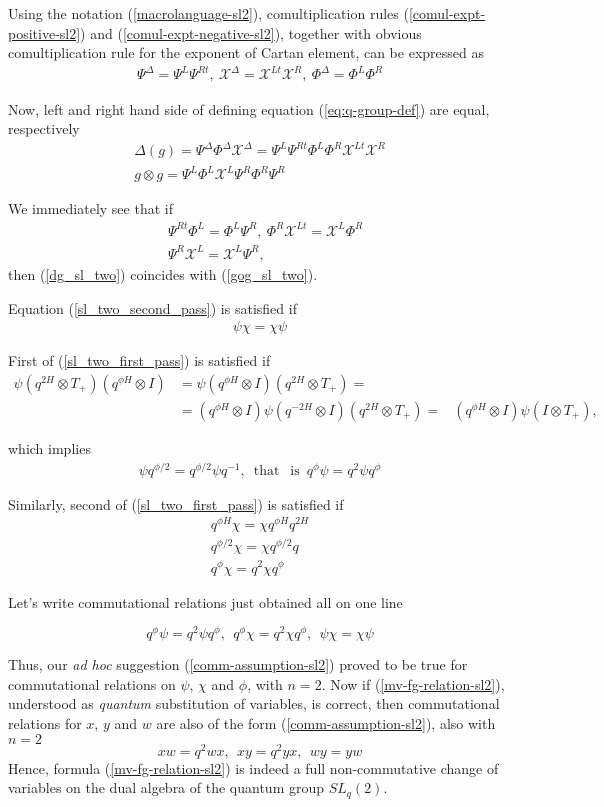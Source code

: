 \documentclass{article}
\newcommand{\lb}{\left (}
\newcommand{\rb}{\right )}
\newcommand{\be}{\begin{eqnarray}}
\newcommand{\ee}{\end{eqnarray}}
\DeclareMathOperator{\that}{that}
\DeclareMathOperator{\is}{is}
\newcommand {\?}{\textit{???}}
\def\dg{\Delta (g)}
\def\gog{g \otimes g}
\def\Chi{\mathcal{X}}
\newcommand{\EChiL}[1][]{\Chi^L_{#1}}
\newcommand{\EChiR}[1][]{\Chi^R_{#1}}
\newcommand{\EChiLT}[1][]{\Chi^{Lt}_{#1}}
\newcommand{\EChiD}[1][]{\Chi^\Delta_{#1}}
\newcommand{\EPsiL}[1][]{\Psi^L_{#1}}
\newcommand{\EPsiR}[1][]{\Psi^R_{#1}}
\newcommand{\EPsiRT}[1][]{\Psi^{Rt}_{#1}}
\newcommand{\EPsiD}[1][]{\Psi^\Delta_{#1}}
\newcommand{\QPhiL}[1][]{\Phi^L_{#1}}
\newcommand{\QPhiR}[1][]{\Phi^R_{#1}}
\newcommand{\QPhiD}[1][]{\Phi^\Delta_{#1}}
\newcommand{\delabel}[1]{(\ref{#1})}
\begin{document}
Using the notation \delabel{macrolanguage-sl2}, comultiplication rules \delabel{comul-expt-positive-sl2} and
\delabel{comul-expt-negative-sl2}, together with obvious comultiplication rule for the exponent of Cartan element,
can be expressed as
\be
\EPsiD = \EPsiL \EPsiRT,\ \EChiD = \EChiLT \EChiR,\ \QPhiD = \QPhiL \QPhiR
\ee

Now, left and right hand side of defining equation \delabel{eq:q-group-def} are equal, respectively
\be
& \dg = \EPsiD \QPhiD \EChiD = \EPsiL \EPsiRT \QPhiL \QPhiR \EChiLT \EChiR \label{dg_sl_two} & \\
& \gog = \EPsiL \QPhiL \EChiL \EPsiR \QPhiR \EPsiR \label{gog_sl_two} &
\ee

We immediately see that if
\be
& \EPsiRT \QPhiL = \QPhiL \EPsiR,\ \QPhiR \EChiLT = \EChiL \QPhiR \label{sl_two_first_pass} \\
& \EPsiR \EChiL = \EChiL \EPsiR \label{sl_two_second_pass}
,
\ee
then (\ref{dg_sl_two}) coincides with (\ref{gog_sl_two}).

Equation (\ref{sl_two_second_pass}) is satisfied if
\be
\psi \chi = \chi \psi
\ee

First of (\ref{sl_two_first_pass}) is satisfied if
\be
\psi \lb q^{2H} \otimes T_+ \rb \lb q^{\phi H} \otimes I \rb & = \psi \lb q^{\phi H} \otimes I \rb \lb q^{2H} \otimes T_+ \rb = & \nonumber \\
& = \lb q^{\phi H} \otimes I \rb \psi \lb q^{-2H} \otimes I \rb \lb q^{2H} \otimes T_+ \rb = & \lb q^{\phi H} \otimes I \rb \psi \lb I \otimes T_+ \rb,
\ee

which implies
\be
\psi q^{\phi/2} = q^{\phi/2} \psi q^{-1},\ \that\ \is\ q^\phi \psi = q^2 \psi q^\phi
\ee

Similarly, second of (\ref{sl_two_first_pass}) is satisfied if
\be
q^{\phi H} \chi = \chi q^{\phi H} q^{2H} \\ q^{\phi/2} \chi = \chi q^{\phi/2} q \nonumber \\ q^\phi \chi = q^2 \chi q^\phi \nonumber
\ee

Let's write commutational relations just obtained all on one line

\begin{equation}
\label{comm-relations-psichiphi-sl2}
\boxed{
q^\phi \psi = q^2 \psi q^\phi,\ \ q^\phi \chi = q^2 \chi q^\phi,\ \ \psi \chi = \chi \psi
}
\end{equation}

Thus, our {\it ad hoc} suggestion \delabel{comm-assumption-sl2} proved to be true for commutational
relations on $\psi$, $\chi$ and $\phi$, with $n = 2$.
Now if \delabel{mv-fg-relation-sl2}, understood as {\it quantum} substitution of variables, is correct,
then commutational relations for $x$, $y$ and $w$ are also of the form \delabel{comm-assumption-sl2},
also with $n = 2$
\begin{equation}
\label{comm-relations-wxy-sl2}
\boxed{
x w = q^2 w x,\ \ x y = q^2 y x,\ \ w y = y w
}
\end{equation}
Hence, formula \delabel{mv-fg-relation-sl2} is indeed a full non-commutative change of variables on the
dual algebra of the quantum group $SL_q(2)$.
\end{document}
